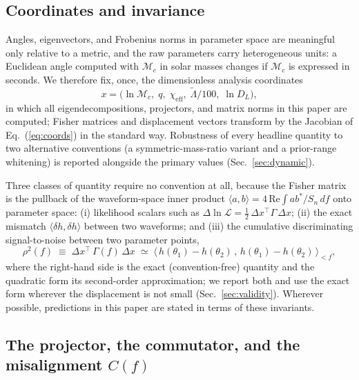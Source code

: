 \documentclass[twocolumn,prd,showpacs,superscriptaddress]{revtex4-2}
\newcommand{\inner}[2]{\langle #1, #2 \rangle}
\newcommand{\Mchirp}{\mathcal{M}_c}
\newcommand{\Lambdatilde}{\tilde{\Lambda}}
\newcommand{\chieff}{\chi_{\text{eff}}}
\newcommand{\Dl}{D_L}
\newcommand{\rhosq}{\rho^{2}}    %
\newcommand{\secref}[1]{Sec.~\ref{sec:#1}}
\newcommand{\eqnref}[1]{Eq.~(\ref{eq:#1})}
\begin{document}
\subsection{Coordinates and invariance}
\label{sec:coordinates}

Angles, eigenvectors, and Frobenius norms in parameter space are meaningful only relative to a metric, and the raw parameters carry heterogeneous units: a Euclidean angle computed with $\Mchirp$ in solar masses changes if $\Mchirp$ is expressed in seconds. We therefore fix, once, the dimensionless analysis coordinates
\begin{equation}
x = \bigl(\ln \Mchirp,\; q,\; \chieff,\; \Lambdatilde/100,\; \ln \Dl\bigr),
\label{eq:coords}
\end{equation}
in which all eigendecompositions, projectors, and matrix norms in this paper are computed; Fisher matrices and displacement vectors transform by the Jacobian of \eqnref{coords} in the standard way. Robustness of every headline quantity to two alternative conventions (a symmetric-mass-ratio variant and a prior-range whitening) is reported alongside the primary values (\secref{dynamic}).

Three classes of quantity require no convention at all, because the Fisher matrix is the pullback of the waveform-space inner product $\inner{a}{b} = 4\,\mathrm{Re}\!\int a b^{*}/S_n\,df$ onto parameter space: (i) likelihood scalars such as $\Delta\ln\mathcal{L} = \tfrac12\,\Delta x^{\top}\Gamma\,\Delta x$; (ii) the exact mismatch $\inner{\delta h}{\delta h}$ between two waveforms; and (iii) the cumulative discriminating signal-to-noise between two parameter points,
\begin{equation}
\rhosq(f) \;\equiv\; \Delta x^{\top}\,\Gamma(f)\,\Delta x
\;\simeq\; \inner{\,h(\theta_1)-h(\theta_2)\,}{\,h(\theta_1)-h(\theta_2)\,}_{<f},
\label{eq:rhosq}
\end{equation}
where the right-hand side is the exact (convention-free) quantity and the quadratic form its second-order approximation; we report both and use the exact form wherever the displacement is not small (\secref{validity}). Wherever possible, predictions in this paper are stated in terms of these invariants.

\subsection{The projector, the commutator, and the misalignment $C(f)$}
\label{sec:commutator}
\end{document}
